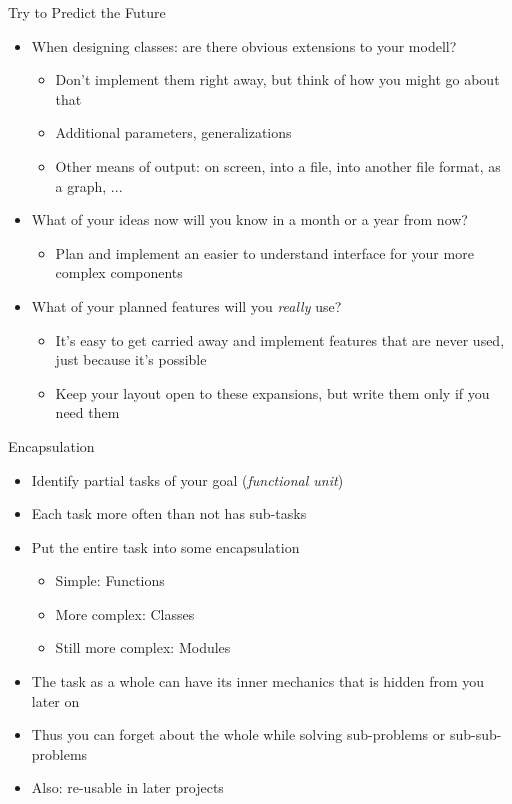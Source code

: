 
\begin{frame}{Try to Predict the Future}
%
\begin{itemize}
\item When designing classes: are there obvious extensions to your modell?
	\begin{itemize}
	\item Don't implement them right away, but think of how you might go about that
	\item Additional parameters, generalizations
	\item Other means of output: on screen, into a file, into another file format, as a graph, ...
	\end{itemize}
\item What of your ideas now will you know in a month or a year from now?
	\begin{itemize}
	\item Plan and implement an easier to understand interface for your more complex components
	\end{itemize}
\item What of your planned features will you \emph{really} use?
	\begin{itemize}
	\item It's easy to get carried away and implement features that are never used, just because it's possible
	\item Keep your layout open to these expansions, but write them only if you need them
	\end{itemize}
\end{itemize}
%
\end{frame}


\begin{frame}{Encapsulation}
%
\begin{itemize}
\item Identify partial tasks of your goal (\emph{functional unit})
\item Each task more often than not has sub-tasks
\item Put the entire task into some encapsulation
	\begin{itemize}
	\item Simple: Functions
	\item More complex: Classes
	\item Still more complex: Modules
	\end{itemize}
\item The task as a whole can have its inner mechanics that is hidden from you later on
\item Thus you can forget about the whole while solving sub-problems or sub-sub-problems
\item Also: re-usable in later projects
\end{itemize}
%
\end{frame}

